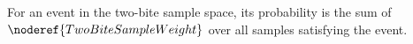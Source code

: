 \begin{definition}
For an event in the two-bite sample space, its probability is the sum of
\(\noderef{TwoBiteSampleWeight}\) over all samples satisfying the event.
\end{definition}

